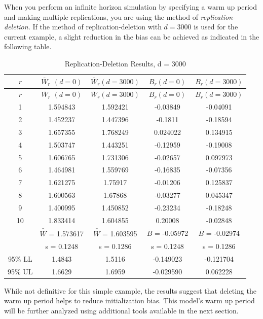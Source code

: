 \documentclass[
]{book}
\theoremstyle{definition}
\theoremstyle{definition}
\theoremstyle{definition}
\theoremstyle{definition}
\theoremstyle{remark}
\begin{document}
When you perform an infinite horizon simulation by specifying a warm up
period and making multiple replications, you are using the method of
\emph{replication-deletion.} If the method of replication-deletion with
\(d = 3000\) is used for the current example, a slight reduction in the
bias can be achieved as indicated in the following table.

\begin{longtable}[]{@{}ccccc@{}}
\caption{Replication-Deletion Results, d = 3000}\tabularnewline
\toprule
\(r\) & \(\bar{W}_r\) \((d = 0)\) & \(\bar{W}_r(d = 3000)\) & \(B_r(d = 0)\) & \(B_r(d = 3000)\) \\
\midrule
\endfirsthead
\toprule
\(r\) & \(\bar{W}_r\) \((d = 0)\) & \(\bar{W}_r(d = 3000)\) & \(B_r(d = 0)\) & \(B_r(d = 3000)\) \\
\midrule
\endhead
1 & 1.594843 & 1.592421 & -0.03849 & -0.04091 \\
2 & 1.452237 & 1.447396 & -0.1811 & -0.18594 \\
3 & 1.657355 & 1.768249 & 0.024022 & 0.134915 \\
4 & 1.503747 & 1.443251 & -0.12959 & -0.19008 \\
5 & 1.606765 & 1.731306 & -0.02657 & 0.097973 \\
6 & 1.464981 & 1.559769 & -0.16835 & -0.07356 \\
7 & 1.621275 & 1.75917 & -0.01206 & 0.125837 \\
8 & 1.600563 & 1.67868 & -0.03277 & 0.045347 \\
9 & 1.400995 & 1.450852 & -0.23234 & -0.18248 \\
10 & 1.833414 & 1.604855 & 0.20008 & -0.02848 \\
& \(\bar{\bar{W}}\) = 1.573617 & \(\bar{\bar{W}}\) = 1.603595 & \(\bar{B}\) = -0.05972 & \(\bar{B}\) = -0.02974 \\
& s = 0.1248 & s = 0.1286 & s = 0.1248 & s = 0.1286 \\
95\% LL & 1.4843 & 1.5116 & -0.149023 & -0.121704 \\
95\% UL & 1.6629 & 1.6959 & -0.029590 & 0.062228 \\
\bottomrule
\end{longtable}

While not definitive for this simple example, the results suggest that
deleting the warm up period helps to reduce initialization bias. This
model's warm up period will be further analyzed using additional tools
available in the next section.
\end{document}
